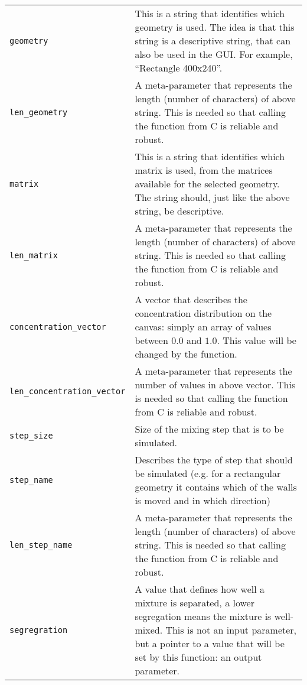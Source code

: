 \begin{longtable}{@{}lX@{}}
	\toprule
	\endfirsthead
	\midrule
	\endhead
	
	\texttt{geometry} & This is a string that identifies which geometry is used. The idea is that this string is a descriptive string, that can also be used in the GUI. For example, ``Rectangle 400x240''. \\
	\texttt{len\_geometry} & A meta-parameter that represents the length (number of characters) of above string. This is needed so that calling the function from C is reliable and robust. \\
	\midrule
	
	\texttt{matrix} & This is a string that identifies which matrix is used, from the matrices available for the selected geometry. The string should, just like the above string, be descriptive. \\
	\texttt{len\_matrix} & A meta-parameter that represents the length (number of characters) of above string. This is needed so that calling the function from C is reliable and robust. \\
	\midrule
	
	\texttt{concentration\_vector} & A vector that describes the concentration distribution on the canvas: simply an array of values between $0.0$ and $1.0$. This value will be changed by the function. \\
	\texttt{len\_concentration\_vector} & A meta-parameter that represents the number of values in above vector. This is needed so that calling the function from C is reliable and robust. \\
	\midrule
	
	\texttt{step\_size} & Size of the mixing step that is to be simulated. \\
	\midrule
	
	\texttt{step\_name} & Describes the type of step that should be simulated (e.g. for a rectangular geometry it contains which of the walls is moved and in which direction) \\
	\texttt{len\_step\_name} & A meta-parameter that represents the length (number of characters) of above string. This is needed so that calling the function from C is reliable and robust. \\
	\midrule
	
	\texttt{segregration} & A value that defines how well a mixture is separated, a lower segregation means the mixture is well-mixed. This is not an input parameter, but a pointer to a value that will be set by this function: an output parameter. \\
	\bottomrule
\end{longtable}